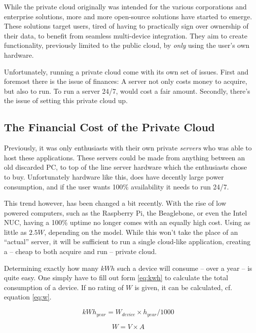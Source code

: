 		While the private cloud originally was intended for the various corporations and enterprise solutions, more and more open-source solutions have started to emerge. These solutions target users, tired of having to practically sign over ownership of their data, to benefit from seamless multi-device integration. They aim to create functionality, previously limited to the public cloud, by \emph{only} using the user's own hardware.

		Unfortunately, running a private cloud come with its own set of issues. First and foremost there is the issue of finances: A server not only costs money to acquire, but also to run. To run a server 24/7, would cost a fair amount. Secondly, there's the issue of setting this private cloud up. 

		\subsection*{The Financial Cost of the Private Cloud}
			\label{sec:privatecloud_cost}
			Previously, it was only enthusiasts with their own private \emph{servers} who was able to host these applications. These servers could be made from anything between an old discarded PC, to top of the line server hardware which the enthusiasts chose to buy. Unfortunately hardware like this, does have decently large power consumption, and if the user wants 100\% availability it needs to run 24/7.

			This trend however, has been changed a bit recently. With the rise of low powered computers, such as the Raspberry Pi, the Beaglebone, or even the Intel NUC, having a 100\% uptime no longer comes with an equally high cost. Using as little as $2.5W$, depending on the model. While this won't take the place of an ``actual'' server, it will be sufficient to run a single cloud-like application, creating a -- cheap to both acquire and run -- private cloud.

			Determining exactly how many $kWh$ such a device will consume -- over a year -- is quite easy. One simply have to fill out form \ref{eq:kwh} to calculate the total consumption of a device. If no rating of $W$ is given, it can be calculated, cf. equation \ref{eq:w}.

			\begin{equation}
				kWh_{year} = W_{device} \times h_{year} / 1000
				\label{eq:kwh}
			\end{equation}

			\begin{equation}
				W = V \times A
				\label{eq:w}
			\end{equation}

